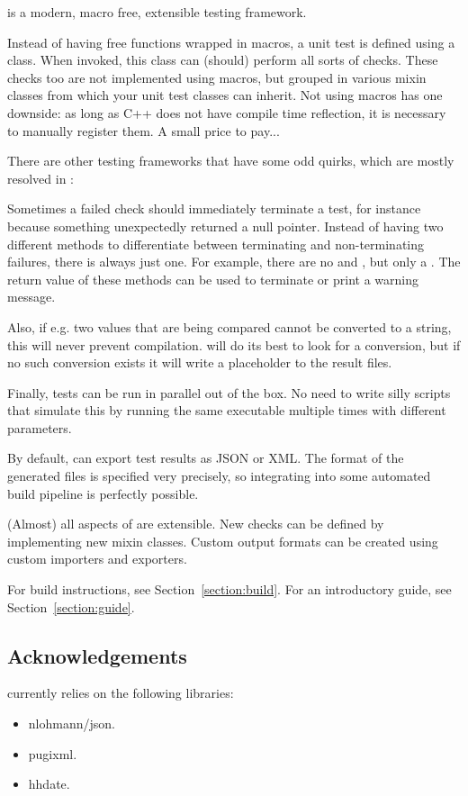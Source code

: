  is a modern, macro free, extensible testing framework.

Instead of having free functions wrapped in macros, a unit test is defined using a class. When invoked, this class can (should) perform all sorts of checks. These checks too are not implemented using macros, but grouped in various mixin classes from which your unit test classes can inherit. Not using macros has one downside: as long as C++ does not have compile time reflection, it is necessary to manually register them. A small price to pay...

There are other testing frameworks that have some odd quirks, which are mostly resolved in :

Sometimes a failed check should immediately terminate a test, for instance because something unexpectedly returned a null pointer. Instead of having two different methods to differentiate between terminating and non-terminating failures, there is always just one. For example, there are no  and , but only a . The return value of these methods can be used to terminate or print a warning message.

Also, if e.g. two values that are being compared cannot be converted to a string, this will never prevent compilation.  will do its best to look for a conversion, but if no such conversion exists it will write a placeholder to the result files.

Finally, tests can be run in parallel out of the box. No need to write silly scripts that simulate this by running the same executable multiple times with different parameters.

By default,  can export test results as JSON or XML. The format of the generated files is specified very precisely, so integrating  into some automated build pipeline is perfectly possible.

(Almost) all aspects of  are extensible. New checks can be defined by implementing new mixin classes. Custom output formats can be created using custom importers and exporters.

For build instructions, see Section~\ref{section:build}. For an introductory guide, see Section~\ref{section:guide}.

\subsection{Acknowledgements}
\label{section:introduction:acknowledgements}

 currently relies on the following libraries:

\begin{itemize}
	\item nlohmann/json\cite{nlohmann}.
	\item pugixml\cite{pugixml}.
	\item hhdate\cite{hhdate}.
\end{itemize}